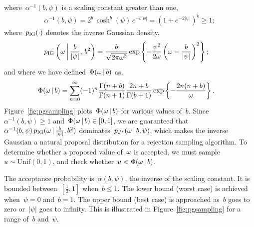 where~$\alpha^{-1}(b,\psi)$ is a scaling constant greater than one,
\begin{align*}
  \alpha^{-1}(b,\psi) = 2^b \, \cosh^b(\psi) \, e^{-b|\psi|} 
  = \left(1 + e^{-2|\psi|} \right)^b \geq 1;
\end{align*}
where~$p_{\mathrm{IG}}(\cdot)$ denotes the inverse Gaussian density,
\begin{align*}
p_{\mathrm{IG}} \left({\omega} \, \bigg| \, \frac{b}{|\psi|}, \, b^2 \right) 
  &= \frac{b}{\sqrt{2\pi {\omega}^3}}
    \exp \left \{ - \frac{\psi^2}{2{\omega}}  \left({\omega} - \frac{b}{|\psi|} \right)^2   \right \};
\end{align*}
and where we have defined~$\Phi({\omega} \,|\, b)$ as,
\begin{align*}
  \Phi({\omega} \,|\, b)  
  &= \sum_{n=0}^\infty (-1)^n \frac{\Gamma(n+b)}{\Gamma(n+1)} \frac{2n+b}{\Gamma(b+1)}
    \exp\left\{- \frac{2n(n+b)}{{\omega}} \right\}.  
\end{align*}
Figure~\ref{fig:pgsampling} plots~$\Phi({\omega} \,|\, b)$ for various values of~$b$.
Since~$\alpha^{-1}(b,\psi)\geq 1$ and~$\Phi({\omega} \,|\, b) \in [0,1]$,
we are guaranteed that~${\alpha^{-1}(b,\psi)\,
  p_{\mathrm{IG}}({\omega} \,|\, \tfrac{b}{|\psi|}, b^2)}$
dominates~$p_{J^{*}}({\omega} \,|\, b,\psi)$, which makes the
inverse Gaussian a natural proposal distribution for a rejection
sampling algorithm.  To determine whether a proposed value of~${\omega}$
is accepted, we must sample~$u \sim \mathrm{Unif}(0,1)$, and check
whether~$u < \Phi({\omega} \,|\, b)$.

The acceptance probability is~$\alpha(b,\psi)$, the inverse of the
scaling constant. It is bounded
between~$[\tfrac{1}{2}, 1]$ when~$b \leq 1$.
The lower bound (worst case) is achieved when~$\psi=0$ and~$b=1$.
The upper bound (best case) is approached as~$b$ goes to zero or~$|\psi|$ goes 
to infinity.
This is illustrated in Figure~\ref{fig:pgsampling} for a 
range of~$b$ and~$\psi$.

